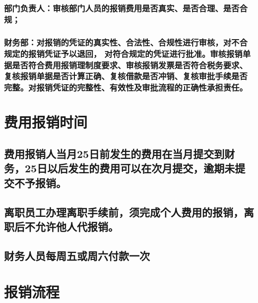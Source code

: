 \documentclass[16pt]{article}
\begin{document}
\subsubsection{部门负责人：审核部门人员的报销费用是否真实、是否合理、是否合规；}
\subsubsection{财务部：对报销的凭证的真实性、合法性、合规性进行审核，对不合规定的报销凭证予以退回，
对符合规定的凭证进行批准。审核报销单据是否符合费用报销理制度要求、审核报销发票是否符合税务要求、
复核报销单据是否计算正确、复核借款是否冲销、复核审批手续是否完整。对报销凭证的完整性、有效性及审批流程的正确性承担责任。}

\section{费用报销时间}
\subsection{费用报销人当月25日前发生的费用在当月提交到财务，25日以后发生的费用可以在次月提交，逾期未提交不予报销。}
\subsection{离职员工办理离职手续前，须完成个人费用的报销，离职后不允许他人代报销。}
\subsection{财务人员每周五或周六付款一次}
\pagebreak

\section{报销流程}
\end{document}
